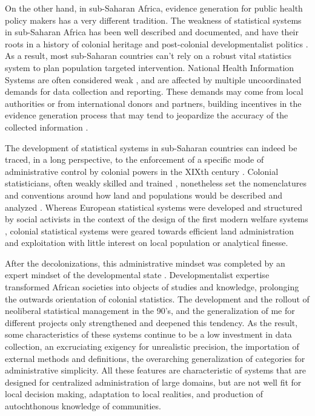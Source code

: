 On the other hand, in sub-Saharan Africa, evidence generation for public health policy makers has a very different tradition. The weakness of statistical systems in sub-Saharan Africa has been well described and documented, and have their roots in a history of colonial heritage and post-colonial developmentalist politics \citep{jerven_poor_2013}. As a result, most sub-Saharan countries can't rely on a robust vital statistics system to plan population targeted intervention. National Health Information Systems are often considered weak \citep{abou-zahr_better_2010,kiberu_strengthening_2014}, and are affected by multiple uncoordinated demands for data collection and reporting. These demands may come from local authorities or from international donors and partners, building incentives in the evidence generation process that may tend to jeopardize the accuracy of the collected information \citep{sandefur_political_2013}.

The development of statistical systems in sub-Saharan countries can indeed  be traced, in a long perspective, to the enforcement of  a specific mode of administrative control by colonial powers in the XIXth century \citep{appadurai_number_1996,cordell_couting_2010,gervais_how_2010}.
Colonial statisticians, often weakly skilled and trained \citep{kateb_gestion_1998,cordell_couting_2010}, nonetheless set the nomenclatures and conventions around how land and populations would be described and analyzed \citep{rambert_cartographie_1922,gervais_how_2010}.
Whereas European statistical systems were developed and structured by social activists in the context of the design of the first modern welfare systems \citep{desrosieres_politique_1993,desrosieres_administrator_1997}, colonial statistical systems were geared towards efficient land administration and exploitation \citep{rambert_cartographie_1922,de_martonne_cartographie_1931} with little interest on local population or analytical finesse.

After the decolonizations, this administrative mindset was completed by an expert mindset of the developmental state \citep{bonneuil_development_2000}. Developmentalist expertise transformed African societies into objects of studies and knowledge, prolonging the outwards orientation of colonial statistics. The development and the rollout of neoliberal statistical management in the 90's, and the generalization of \gls{me} for different projects \citep{desrosieres_prouver_2014} only strengthened and deepened this tendency. As the result, some characteristics of these systems continue to be a low investment in data collection, an excruciating exigency for unrealistic precision, the importation of external methods and definitions, the overarching generalization of categories for administrative simplicity. All these features are characteristic of systems that are designed for centralized administration of large domains, but are not well fit for local decision making, adaptation to local realities, and production of autochthonous knowledge of communities.

